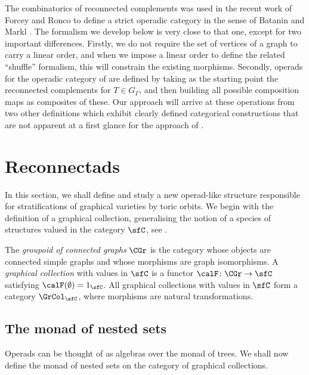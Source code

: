 \begin{rema}
The combinatorics of reconnected complements was used in the recent work of Forcey and Ronco \cite{jlms.12596} to define a strict operadic category in the sense of Batanin and Markl \cite{MR3406537}. The formalism we develop below is very close to that one, except for two important differences. Firstly, we do not require the set of vertices of a graph to carry a linear order, and when we impose a linear order to define the related ``shuffle'' formalism, this will constrain the existing morphisms. Secondly, operads for the operadic category of \cite{jlms.12596} are defined by taking as the starting point the reconnected complements for $T\in G_\Gamma$, and then building all possible composition maps as composites of these. Our approach will arrive at these operations from two other definitions which exhibit clearly defined categorical constructions that are not apparent at a first glance for the approach of \cite{jlms.12596}.
\end{rema}

\section{Reconnectads}\label{sec:reconnectads}

In this section, we shall define and study a new operad-like structure responsible for stratifications of graphical varieties by toric orbits. We begin with the definition of a graphical collection, generalising the notion of a species of structures valued in the category $\sfC$, see \cite{MR1629341,MR633783}.

\begin{defi}
The \emph{groupoid of connected graphs} $\CGr$ is the category whose objects are connected simple graphs and whose morphisms are graph isomorphisms.
A \emph{graphical collection} with values in $\sfC$ is a functor $\calF\colon \CGr\to\sfC$ satisfying $\calF(\emptyset)=1_{\sfC}$. All graphical collections with values in $\sfC$ form a category $\GrCol_{\sfC}$, where morphisms are natural transformations. 
\end{defi}

\subsection{The monad of nested sets}

Operads can be thought of as algebras over the monad of trees. We shall now define the monad of nested sets on the category of graphical collections. 

